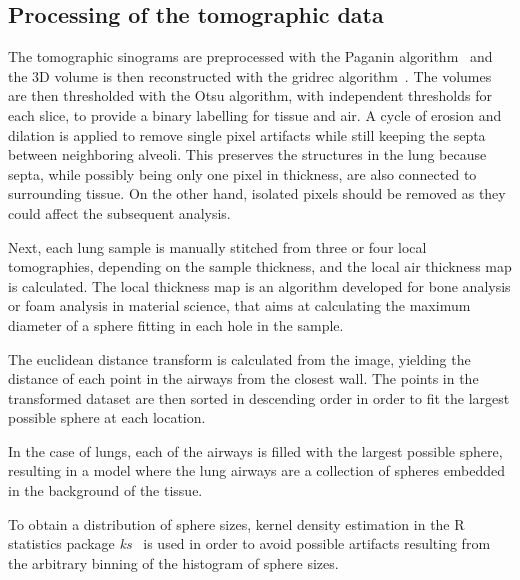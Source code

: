 
\subsection{Processing of the tomographic data}\label{sec:tomoprocessing}
The tomographic sinograms are preprocessed with the Paganin
algorithm~\cite{doi:10.1046/j.1365-2818.2002.01010.x} and
the 3D volume is then reconstructed with the gridrec
algorithm~\cite{Marone:pp5022}. The volumes
are then thresholded with the Otsu algorithm, with independent thresholds
for each slice, to provide a binary labelling for tissue and air. A cycle of
erosion and dilation is applied to remove single pixel artifacts while still
keeping the septa between neighboring alveoli. This preserves the structures
in the lung because septa, while possibly being only one pixel in thickness,
are also connected to surrounding tissue. On the other hand, isolated pixels
should be removed as they could affect the subsequent analysis.

Next, each lung sample is manually stitched from three or four local
tomographies, depending on the sample thickness, and the local air thickness
map is calculated. The local thickness map is an algorithm developed for
bone analysis or foam analysis in material science, that aims at calculating
the maximum diameter of a sphere fitting in each hole in the sample.

The euclidean distance transform is calculated from the image, yielding the
distance of each point in the airways from the closest wall. The points in
the transformed dataset are then sorted in descending order in order to fit
the largest possible sphere at each location.

In the case of lungs, each of the airways is filled with the largest possible
sphere, resulting in a model where the lung airways are a collection of
spheres embedded in the background of the tissue.

To obtain a distribution of sphere sizes, kernel density estimation in the R
statistics package \emph{ks}~\cite{JSSv021i07} is used in order to avoid possible artifacts
resulting from the arbitrary binning of the histogram of sphere sizes.

